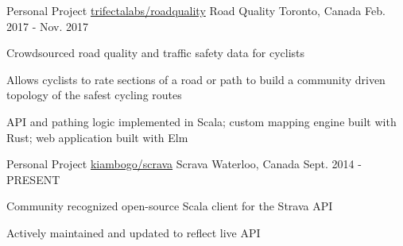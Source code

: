 \begin{cventries}
  \cventry
  {Personal Project \hspace{1mm} \href{https://github.com/trifectalabs/roadquality}{\faGithubSquare \hspace{0.5mm} trifectalabs/roadquality}}
    {Road Quality}
    {Toronto, Canada}
    {Feb. 2017 - Nov. 2017}
    {
      \begin{cvitems}
        \item {Crowdsourced road quality and traffic safety data for cyclists}
        \item {Allows cyclists to rate sections of a road or path to build a
            community driven topology of the safest cycling routes}
        \item {API and pathing logic implemented in Scala; custom mapping engine built with Rust; web application built with
          Elm}
      \end{cvitems}
    }
  \cventry
  {Personal Project \hspace{1mm} \href{https://github.com/kiambogo/scrava}{\faGithubSquare \hspace{0.5mm} kiambogo/scrava}}
    {Scrava}
    {Waterloo, Canada}
    {Sept. 2014 - PRESENT}
    {
      \begin{cvitems}
        \item {Community recognized open-source Scala client for the Strava API}
        \item {Actively maintained and updated to reflect live API}
      \end{cvitems}
    }
\end{cventries}

